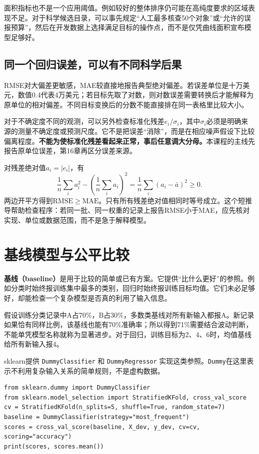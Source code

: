 面积指标也不是一个应用阈值。例如较好的整体排序仍可能在高纯度要求的区域表现不足。对于科学候选目录，可以事先规定“人工最多核查50个对象”或“允许的误报预算”，然后在开发数据上选择满足目标的操作点，而不是仅凭曲线面积宣布模型足够好。

\subsection{同一个回归误差，可以有不同科学后果}
RMSE对大偏差更敏感，MAE较直接地报告典型绝对偏差。若误差单位是十万美元，数值0.4代表4万美元；若目标先取了对数，则对数误差需要转换后才能解释为原单位的相对偏差。不同目标变换后的分数不能直接排在同一表格里比较大小。

对于不确定度不同的观测，可以另外检查标准化残差$e_i/\sigma_i$，其中$\sigma_i$必须是明确来源的测量不确定度或预测尺度。它不是把误差“消除”，而是在相应噪声假设下比较偏离程度。\textbf{不能为使标准化残差看起来正常，事后任意调大分母。}本课程的主线先报告原单位误差，第16章再区分误差来源。

对残差绝对值$a_i=|e_i|$，有
\[
\frac1n\sum_i a_i^2-\left(\frac1n\sum_i a_i\right)^2
=\frac1n\sum_i(a_i-\bar a)^2\ge0.
\]
两边开平方得到$\mathrm{RMSE}\ge\mathrm{MAE}$。只有所有残差绝对值相同时等号成立。这个短推导帮助检查程序：若同一批、同一权重的记录上报告RMSE小于MAE，应先核对实现、单位或数据范围，而不是急于解释模型。

\section{基线模型与公平比较}
\textbf{基线（baseline）}是用于比较的简单或已有方案。它提供“比什么更好”的参照。例如分类时始终报训练集中最多的类别，回归时始终报训练目标均值。它们未必足够好，却能检查一个复杂模型是否真的利用了输入信息。

假设训练分类记录中A占70\%，B占30\%，多数类基线对所有新输入都报A。新记录如果恰有同样比例，该基线也能有70\%准确率；所以得到71\%需要结合波动判断，不能单凭模型名称就称为显著进步。对于回归，训练目标为2、4、6时，均值基线给所有新输入报4。

sklearn提供 \texttt{DummyClassifier} 和 \texttt{DummyRegressor} 实现这类参照。\texttt{Dummy}在这里表示不利用复杂输入关系的简单规则，不是虚构数据。
\begin{lstlisting}[caption={先建立能解释清楚的多数类基线}]
from sklearn.dummy import DummyClassifier
from sklearn.model_selection import StratifiedKFold, cross_val_score
cv = StratifiedKFold(n_splits=5, shuffle=True, random_state=7)
baseline = DummyClassifier(strategy="most_frequent")
scores = cross_val_score(baseline, X_dev, y_dev, cv=cv, scoring="accuracy")
print(scores, scores.mean())
\end{lstlisting}

